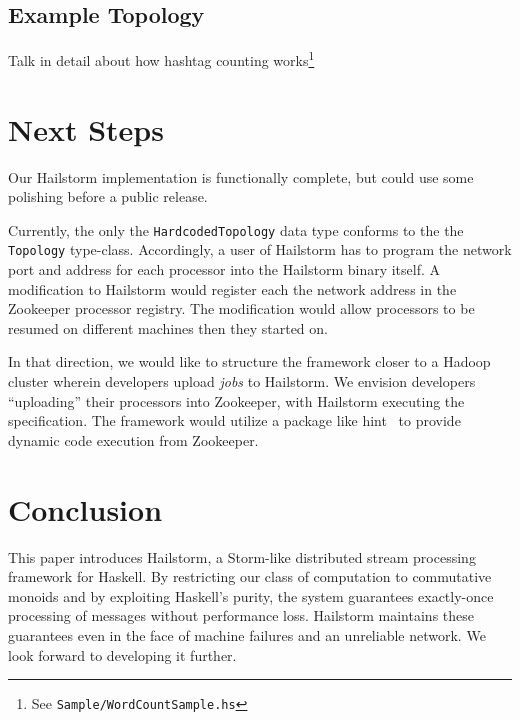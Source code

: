 \documentclass[10pt,nocopyrightspace]{sigplanconf}
\begin{document}
\subsection{Example Topology}
Talk in detail about how hashtag counting works\footnote{See
\texttt{Sample/WordCountSample.hs}}

\section{Next Steps}
Our Hailstorm implementation is functionally complete, but could use some
polishing before a public release.

Currently, the only the \texttt{HardcodedTopology} data type conforms to the the
\texttt{Topology} type-class. Accordingly, a user of Hailstorm has to program
the network port and address for each processor into the Hailstorm binary
itself. A modification to Hailstorm would register each the network address
in the Zookeeper processor registry. The modification would allow processors to
be resumed on different machines then they started on.

In that direction, we would like to structure the framework closer to a Hadoop
cluster wherein developers upload \textit{jobs} to Hailstorm. We envision
developers ``uploading'' their processors into Zookeeper, with Hailstorm
executing the specification. The framework would utilize a package like
hint~\cite{hint} to provide dynamic code execution from Zookeeper.

\section{Conclusion}
This paper introduces Hailstorm, a Storm-like distributed stream processing
framework for Haskell. By restricting our class of computation to commutative
monoids and by exploiting Haskell's purity, the system guarantees exactly-once
processing of messages without performance loss. Hailstorm maintains these
guarantees even in the face of machine failures and an unreliable network. We
look forward to developing it further.

{}

\end{document}
